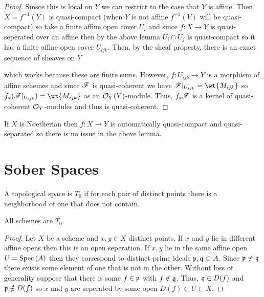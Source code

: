 \documentclass[12pt]{article}
\begin{document}
\begin{proof}
Sinsce this is local on $Y$ we can restrict to the case that $Y$ is affine. Then   $X = f^{-1}(Y)$ is quasi-compact (when $Y$ is not affine $f^{-1}(V)$ will be quasi-compact) so take a finite affine open cover $U_i$ and since $f : X \to Y$ is quasi-seperated over an affine then by the above lemma $U_i \cap U_j$ is quasi-compact so it has a finite affine open cover $U_{ijk}$. Then, by the sheaf property, there is an exact sequence of sheaves on $Y$
\begin{center}
\end{center}
which works because these are finite sums. However, $f : U_{ijk} \to Y$ is a morphism of affine schemes and since $\mathscr{F}$ is quasi-coherent we have $\F |_{U_{ijk}} = \wt{M_{ijk}}$ so $f_* (\F|_{U_{ijk}}) = \wt{M_{ijk}}$ as an $\mathcal{O}_{Y}(Y)$-module. Thus, $f_* \mathscr{F}$ is a kernel of quasi-coherent $\mathcal{O}_{Y}$-modules and thus is quasi-coherent. 
\end{proof}

\begin{rmk}
If $X$ is Noetherian then $f : X \to Y$ is automatically quasi-compact and quasi-separated so there is no issue in the above lemma.
\end{rmk}


\section{Sober Spaces}

\begin{definition}
A topological space is $T_0$ if for each pair of distinct points there is a neighborhood of one that does not contain. 
\end{definition}

\begin{proposition}
All schemes are $T_0$. 
\end{proposition}

\begin{proof}
Let $X$ be a scheme and $x, y \in X$ distinct points. If $x$ and $y$ lie in different affine opens then this is an open seperation. If $x, y$ lie in the same affine open $U = \mathrm{Spec}\left( A \right)$ then they correspond to distinct prime ideals $\mathfrak{p}, \mathfrak{q} \subset A$. Since $\mathfrak{p} \neq \mathfrak{q}$ there exists some element of one that is not in the other. Without loss of generality suppose that there is some $f \in \mathfrak{p}$ with $f \notin \mathfrak{q}$. Thus, $\mathfrak{q} \in D(f)$ and $\mathfrak{p} \notin D(f)$ so $x$ and $y$ are seperated by some open $D(f) \subset U \subset X$.  
\end{proof}
\end{document}
